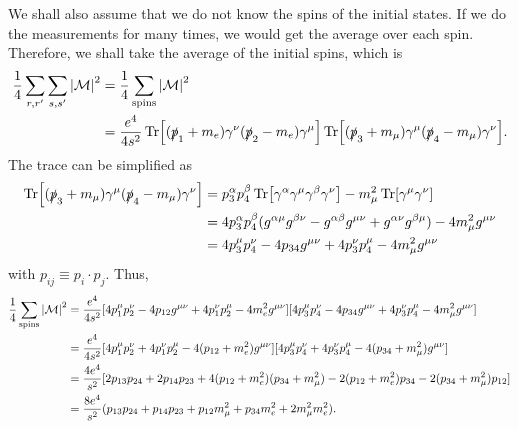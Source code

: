 \documentclass[11pt]{article}
\theoremstyle{definition}
\begin{document}
We shall also assume that we do not know the spins of the initial states. If we do the measurements for many times, we would get the average over each spin. Therefore, we shall take the average of the initial spins, which is
\begin{equation}
    \begin{aligned}
        \frac{1}{4}\sum_{r,r'}\sum_{s,s'}\abs{\mathcal{M}}^2 &= \frac{1}{4}\sum_\text{spins}\abs{\mathcal{M}}^2\\
        &= \frac{e^4}{4s^2}\Tr[(\slashed{p}_1 + m_e)\gamma^\nu(\slashed{p}_2-m_e)\gamma^\mu]\Tr[(\slashed{p}_3+m_\mu)\gamma^\mu (\slashed{p}_4-m_\mu)\gamma^\nu].
        \label{EQ. M eemm3}
    \end{aligned}
\end{equation}
The trace can be simplified as
\begin{equation}
    \begin{aligned}
        \Tr[(\slashed{p}_3+m_\mu)\gamma^\mu (\slashed{p}_4-m_\mu)\gamma^\nu] &= p_3^\alpha p_4^\beta\Tr[\gamma^\alpha\gamma^\mu\gamma^\beta\gamma^\nu] - m_\mu^2\Tr[\gamma^\mu\gamma^\nu] \\
        &= 4p_3^\alpha p_4^\beta(g^{\alpha\mu}g^{\beta\nu} - g^{\alpha\beta}g^{\mu\nu} +g^{\alpha\nu}g^{\beta\mu}) - 4m_\mu^2g^{\mu\nu}\\
        &= 4p_3^\mu p_4^\nu - 4p_{34}g^{\mu\nu} + 4p_3^\nu p_4^\mu - 4m_\mu^2g^{\mu\nu}
    \end{aligned}
\end{equation}
with $p_{ij} \equiv p_i \cdot p_j$. Thus,
\begin{equation}
    \begin{aligned}
        \frac{1}{4}\sum_\text{spins}\abs{\mathcal{M}}^2 &= \frac{e^4}{4s^2}[4p_1^\mu p_2^\nu - 4p_{12}g^{\mu\nu} + 4p_1^\nu p_2^\mu - 4m_e^2g^{\mu\nu}
        ][4p_3^\mu p_4^\nu - 4p_{34}g^{\mu\nu} + 4p_3^\nu p_4^\mu - 4m_\mu^2g^{\mu\nu}] \\
        &= \frac{e^4}{4s^2}[4p_1^\mu p_2^\nu + 4p_1^\nu p_2^\mu - 4(p_{12} +m_e^2)g^{\mu\nu}
        ][4p_3^\mu p_4^\nu  + 4p_3^\nu p_4^\mu - 4(p_{34} + m_\mu^2)g^{\mu\nu}]\\
        &= \frac{4e^4}{s^2}[2p_{13}p_{24} + 2p_{14}p_{23} + 4(p_{12} +m_e^2)(p_{34} + m_\mu^2) - 2(p_{12} +m_e^2)p_{34} - 2(p_{34} + m_\mu^2)p_{12}] \\
        &= \frac{8e^4}{s^2}(p_{13}p_{24} + p_{14}p_{23} + p_{12}m_\mu^2 + p_{34}m_e^2 + 2m_\mu^2m_e^2).
    \end{aligned}
\end{equation}
\end{document}
